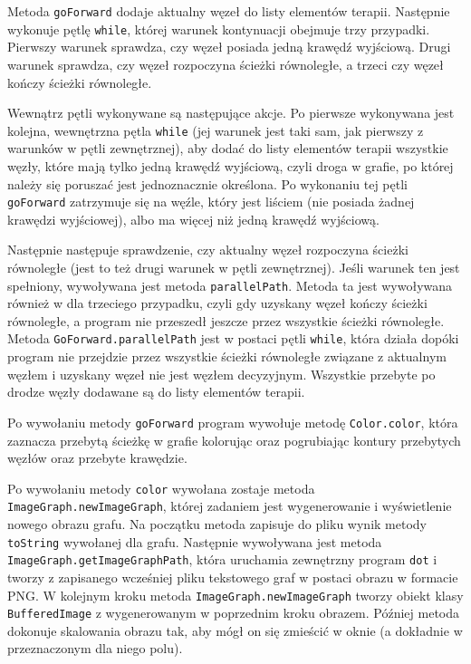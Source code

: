 Metoda \texttt{goForward} dodaje aktualny węzeł do listy elementów terapii. Następnie wykonuje pętlę \texttt{while}, której warunek kontynuacji obejmuje trzy przypadki. Pierwszy warunek sprawdza, czy węzeł posiada jedną krawędź wyjściową. Drugi warunek sprawdza, czy węzeł rozpoczyna ścieżki równoległe, a trzeci czy węzeł kończy ścieżki równoległe. 

Wewnątrz pętli wykonywane są następujące akcje. Po pierwsze wykonywana jest kolejna, wewnętrzna pętla \texttt{while} (jej warunek jest taki sam, jak pierwszy z warunków w pętli zewnętrznej), aby dodać do listy elementów terapii wszystkie węzły, które mają tylko jedną krawędź wyjściową, czyli droga w grafie, po której należy się poruszać jest jednoznacznie określona. Po wykonaniu tej pętli \texttt{goForward} zatrzymuje się na węźle, który jest liściem (nie posiada żadnej krawędzi wyjściowej), albo ma więcej niż jedną krawędź wyjściową.

Następnie następuje sprawdzenie, czy aktualny węzeł rozpoczyna ścieżki równoległe (jest to też drugi warunek w pętli zewnętrznej). Jeśli warunek ten jest spełniony, wywoływana jest metoda \texttt{parallel\-Path}. Metoda ta jest wywoływana również w dla trzeciego przypadku, czyli gdy uzyskany węzeł kończy ścieżki równoległe, a program nie przeszedł jeszcze przez wszystkie ścieżki równoległe. Metoda \texttt{GoForward.parallel\-Path} jest w postaci pętli \texttt{while}, która działa dopóki program nie przejdzie przez wszystkie ścieżki równoległe związane z aktualnym węzłem i uzyskany węzeł nie jest węzłem decyzyjnym. Wszystkie przebyte po drodze węzły dodawane są do listy elementów terapii.  

Po wywołaniu metody \texttt{goForward} program wywołuje metodę \texttt{Color.color}, która zaznacza przebytą ścieżkę w grafie kolorując oraz pogrubiając kontury przebytych węzłów oraz przebyte krawędzie.
 
Po wywołaniu metody \texttt{color} wywołana zostaje metoda \texttt{ImageGraph.newImageGraph}, której zadaniem jest wygenerowanie i wyświetlenie nowego obrazu grafu. Na początku metoda zapisuje do pliku wynik metody \texttt{toString} wywołanej dla grafu. Następnie wywoływana jest metoda \texttt{ImageGraph.getImageGraphPath}, która uruchamia zewnętrzny program \texttt{dot} i tworzy z zapisanego wcześniej pliku tekstowego graf w postaci obrazu w formacie PNG. W kolejnym kroku metoda \texttt{ImageGraph.newImageGraph} tworzy obiekt klasy \texttt{BufferedImage} z wygenerowanym w poprzednim kroku obrazem. Później metoda dokonuje skalowania obrazu tak, aby mógł on się zmieścić w oknie (a dokładnie w przeznaczonym dla niego polu). 

